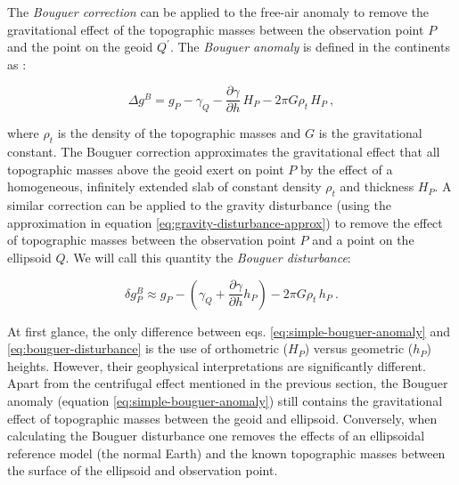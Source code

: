 \documentclass[paper,twocolumn,twoside]{geophysics}
\begin{document}
The \textit{Bouguer correction} can be applied to the free-air anomaly
to remove the gravitational effect of the topographic masses
between the observation point $P$ and the point on the geoid $Q^\prime$.
The \textit{Bouguer anomaly} is defined in the continents as
\citep{blakely1996, hofmann-wellenhof-moritz2005}:

\begin{equation}
\Delta g^{B} = g_{P}
- \gamma_{Q}
- \frac{\partial \gamma}{\partial h} \, H_{P}
- 2 \pi G \rho_{t} \, H_{P}
\: ,
\label{eq:simple-bouguer-anomaly}
\end{equation}

\noindent
where $\rho_t$ is the density of the topographic masses and $G$ is the
gravitational constant.
The Bouguer correction approximates the gravitational effect that all
topographic masses above the geoid exert on point $P$ by the effect of a
homogeneous, infinitely extended slab of constant density $\rho_{t}$ and
thickness $H_{P}$.
A similar correction can be applied to the gravity disturbance
(using the approximation in equation \ref{eq:gravity-disturbance-approx})
to remove the effect of topographic masses between
the observation point $P$ and a point on the ellipsoid $Q$.
We will call this quantity the \textit{Bouguer disturbance}:

\begin{equation}
\delta g_P^{B} \approx
g_{P} -
\left( \gamma_{Q} + \frac{\partial \gamma}{\partial h} h_P \right)
- 2 \pi G \rho_{t} \, h_{P} \: .
\label{eq:bouguer-disturbance}
\end{equation}

At first glance, the only difference between eqs.
\ref{eq:simple-bouguer-anomaly} and \ref{eq:bouguer-disturbance} is the use of
orthometric ($H_P$) versus geometric ($h_P$) heights.
However, their geophysical interpretations are significantly different.
Apart from the centrifugal effect mentioned in the previous section,
the Bouguer anomaly (equation \ref{eq:simple-bouguer-anomaly}) still contains
the gravitational effect of topographic masses between the geoid and ellipsoid.
Conversely, when calculating the Bouguer disturbance one removes the effects of
an ellipsoidal reference model (the normal Earth) and the known topographic
masses between the surface of the ellipsoid and observation point.
\end{document}
